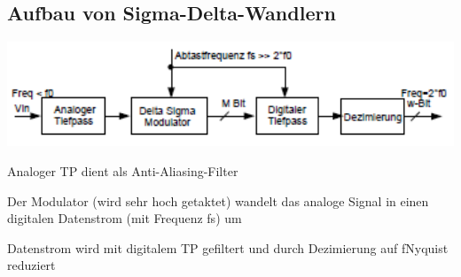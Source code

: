\subsection{Aufbau von Sigma-Delta-Wandlern}
\begin{minipage}{0.55\textwidth}
    \includegraphics[width=1.0\textwidth]{images/AufbauSigmaDeltaWandler}
\end{minipage}
\hfill
\begin{minipage}{0.40\textwidth}
    \begin{compactitem}
        \item Analoger TP dient als Anti-Aliasing-Filter
        \item Der Modulator (wird sehr hoch getaktet) wandelt das analoge Signal in einen digitalen Datenstrom (mit Frequenz fs) um
        \item Datenstrom wird mit digitalem TP gefiltert und durch Dezimierung auf fNyquist reduziert 
    \end{compactitem}
\end{minipage}

